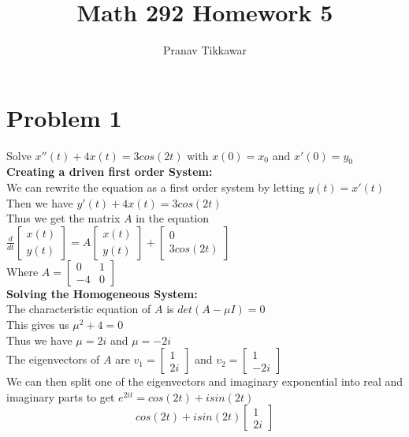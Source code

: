 \documentclass{article}
\author{Pranav Tikkawar}
\title{Math 292 Homework 5}
\begin{document}
\maketitle
\section*{Problem 1}
Solve $x''(t) + 4x(t) = 3cos(2t)$ with $x(0) = x_0$ and $x'(0) = y_0$\\
\textbf{Creating a driven first order System:}\\
We can rewrite the equation as a first order system by letting $y(t) = x'(t)$\\
Then we have $y'(t) + 4x(t) = 3cos(2t)$\\
Thus we get the matrix $A$ in the equation $\frac{d}{dt}\begin{bmatrix}
    x(t)\\
    y(t)
\end{bmatrix} = A\begin{bmatrix}
    x(t)\\
    y(t)
\end{bmatrix} + \begin{bmatrix}
    0\\
    3cos(2t)
\end{bmatrix}$\\
Where $A = \begin{bmatrix}
    0 & 1\\
    -4 & 0
\end{bmatrix}$\\
\textbf{Solving the Homogeneous System:}\\
The characteristic equation of $A$ is $det(A - \mu I) = 0$\\
This gives us $\mu^2 + 4 = 0$\\
Thus we have $\mu = 2i$ and $\mu = -2i$ \\
The eigenvectors of $A$ are $v_1 = \begin{bmatrix}
    1\\
    2i
\end{bmatrix}$ and $v_2 = \begin{bmatrix}
    1\\
    -2i
\end{bmatrix}$\\
We can then split one of the eigenvectors and imaginary exponential into real and imaginary parts to get $e^{2it} = cos(2t) + isin(2t)$\\
$$cos(2t) + isin(2t) \begin{bmatrix}
    1 \\
    2i
\end{bmatrix} $$
\end{document}
